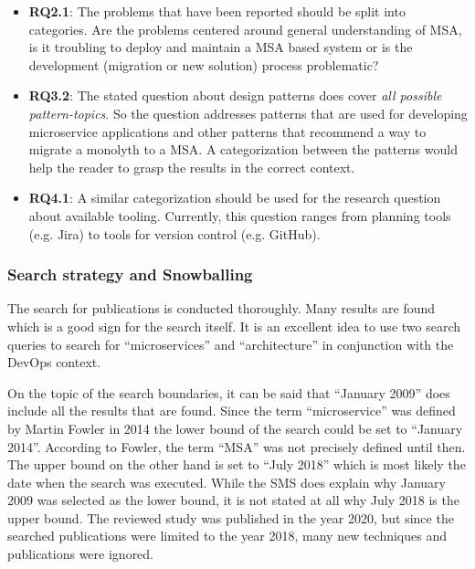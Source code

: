 \begin{itemize}
    \item \textbf{RQ2.1}: The problems that have been reported should be split
    into categories. Are the problems centered around general understanding of
    MSA, is it troubling to deploy and maintain a MSA based system or
    is the development (migration or new solution) process problematic?
    \item \textbf{RQ3.2}: The stated question about design patterns does
    cover \textit{all possible pattern-topics}. So the question addresses
    patterns that are used for developing microservice applications and
    other patterns that recommend a way to migrate a monolyth to a MSA.
    A categorization between the patterns would help the reader to
    grasp the results in the correct context.
    \item \textbf{RQ4.1}: A similar categorization should be used for the
    research question about available tooling. Currently, this question
    ranges from planning tools (e.g. Jira) to tools for version control
    (e.g. GitHub).
\end{itemize}

\subsubsection{Search strategy and Snowballing}

The search for publications is conducted thoroughly. Many results
are found which is a good sign for the search itself. It is an excellent
idea to use two search queries to search for ``microservices'' and
``architecture'' in conjunction with the DevOps context.

On the topic of the search boundaries, it can be said that ``January 2009''
does include all the results that are found. Since the term ``microservice''
was defined by Martin Fowler in 2014 \cite{fowler:microservices} the lower
bound of the search could be set to ``January 2014''. According to Fowler,
the term ``MSA'' was not precisely defined until then.
The upper bound on the other hand is set to ``July 2018'' which is most likely
the date when the search was executed. While the SMS does explain
why January 2009 was selected as the lower bound, it is not stated
at all why July 2018 is the upper bound. The reviewed study was published
in the year 2020, but since the searched publications were limited
to the year 2018, many new techniques and publications were ignored.


